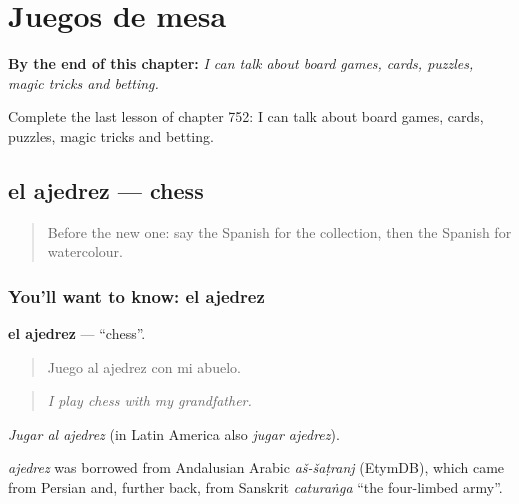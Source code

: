 
\chapter{Juegos de mesa}
\label{ch:es-juegos-de-mesa}

\begin{chapteropening}
\textbf{By the end of this chapter:} \emph{I can talk about board games, cards, puzzles, magic tricks and betting.}

Complete the last lesson of chapter 752: I can talk about board games, cards, puzzles, magic tricks and betting.
\end{chapteropening}

\section[el ajedrez]{el ajedrez — chess}

\label{lesson:ES-C752-ajedrez}



\begin{quote}
Before the new one: say the Spanish for the collection, then the Spanish for watercolour.
\end{quote}

\subsection*{You'll want to know: el ajedrez}
\textbf{el ajedrez} — \textquotedblleft{}chess\textquotedblright{}.

\begin{quote}
Juego al ajedrez con mi abuelo.
\end{quote}

\begin{quote}
\emph{I play chess with my grandfather.}
\end{quote}

\emph{Jugar al ajedrez} (in Latin America also \emph{jugar ajedrez}).

\begin{cousinweb}
\emph{ajedrez} was borrowed from Andalusian Arabic \emph{aš-šaṭranj} (EtymDB), which came from Persian and, further back, from Sanskrit \emph{caturaṅga} \textquotedblleft{}the four-limbed army\textquotedblright{}.
\end{cousinweb}

